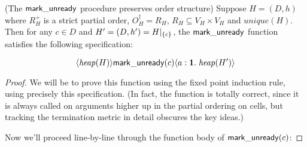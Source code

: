 \begin{lemma}{(The $\mathsf{mark\_unready}$ procedure preserves order structure)}
Suppose $H = (D,h)$ where $R^+_H$ is a strict partial order,
$O^\dagger_H = R_H$, $R_H \subseteq V_H \times V_H$ and
$\mathit{unique}(H)$. Then for any $c \in D$ and $H' = (D, h') =
H|_{\{{c}\}}$, the $\mathsf{mark\_unready}$ function satisfies the following specification:

\begin{displaymath}
\langle{\mathit{heap}(H)}\rangle{\mathsf{mark\_unready}(c)}\langle{a:\mathbf{1}}.\;{\mathit{heap}(H')}\rangle
\end{displaymath}
  
\end{lemma}

\begin{proof}
We will be to prove this function using the fixed point induction
rule, using precisely this specification. (In fact, the function is
totally correct, since it is always called on arguments higher up in
the partial ordering on cells, but tracking the termination metric in
detail obscures the key ideas.)

Now we'll proceed line-by-line through the function body of $\mathsf{mark\_unready}(c)$: 


\end{proof}
